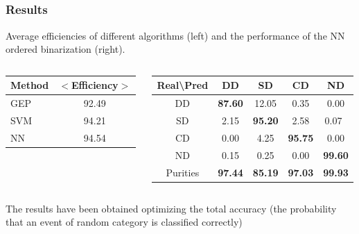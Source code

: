 \documentclass{beamer}
\begin{document}
\subsection{}
\frame
{
  \frametitle{Results}

Average efficiencies of different algorithms (left) and the performance of the NN ordered binarization (right). 

\begin{columns}
\begin{column}{4cm}

{\scriptsize
\begin{table}
\hspace{1.0cm}
\begin{tabular}{l|c}
Method & $<$Efficiency$>$ \\ \hline
GEP & 92.49 \\
SVM & 94.21 \\
NN & 94.54 \\
\end{tabular}
\end{table}
}
\end{column}
\begin{column}{7cm}

\hspace{2.2cm}
{\scriptsize
\begin{table}
\begin{tabular}{c|cccc}
  Real\textbackslash Pred & DD & SD & CD & ND \\ \hline
  DD & {\bf 87.60} & 12.05 & 0.35 & 0.00 \\
  SD & 2.15 & {\bf 95.20} & 2.58 & 0.07 \\
  CD & 0.00 & 4.25 & {\bf 95.75} & 0.00 \\
  ND & 0.15 & 0.25 & 0.00 & {\bf 99.60} \\ \hline
  Purities &  {\bf 97.44} & {\bf 85.19} & {\bf 97.03} & {\bf 99.93}
\end{tabular}
\end{table}
}
\end{column}

\end{columns}

The results have been obtained optimizing the total accuracy
(the probability that an event of random category is classified correctly)
}
\end{document}
